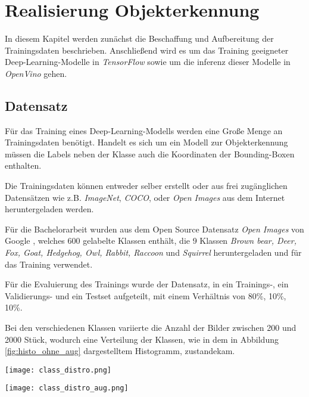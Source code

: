 \chapter{Realisierung Objekterkennung}\label{kap:object_det}

In diesem Kapitel werden zunächst die Beschaffung und Aufbereitung 
der Trainingsdaten beschrieben. Anschließend wird es um das 
Training geeigneter Deep-Learning-Modelle in \textit{TensorFlow}
 sowie um die \Gls{inferenz} dieser Modelle in \textit{OpenVino} gehen.

\section{Datensatz}\label{sec:dataset}

Für das Training eines Deep-Learning-Modells werden 
eine Große Menge an Trainingsdaten benötigt.
Handelt es sich um ein Modell zur Objekterkennung
müssen die Labels neben der Klasse auch die Koordinaten 
der Bounding-Boxen enthalten.

Die Trainingsdaten können entweder selber erstellt oder 
aus frei zugänglichen Datensätzen wie z.B. \textit{ImageNet}, 
\textit{COCO}, oder \textit{Open Images}
aus dem Internet heruntergeladen werden.

Für die Bachelorarbeit wurden aus dem Open Source Datensatz
\textit{Open Images} von Google
\cite{kuznetsovaOpenImagesDataset2018}, 
welches 600 gelabelte Klassen enthält, 
die 9 Klassen \textit{Brown bear, Deer, Fox, Goat, 
Hedgehog, Owl, Rabbit, Raccoon} und \textit{Squirrel}
heruntergeladen und für das Training verwendet.

Für die Evaluierung des Trainings wurde der 
Datensatz, in ein
Trainings-, ein Validierungs- und ein 
Testset aufgeteilt, mit einem Verhältnis von 80\%, 10\%, 10\%.

Bei den verschiedenen Klassen variierte die Anzahl der 
Bilder zwischen 200 und 
2000 Stück, wodurch eine Verteilung der Klassen, 
wie in dem in Abbildung \ref{fig:histo_ohne_aug} dargestelltem
Histogramm, zustandekam.

\vspace{1cm}
\begin{minipage}{0.5\textwidth}
    \centering
    \texttt{[image: class\_distro.png]}
    \label{fig:histo_ohne_aug}
\end{minipage}
\begin{minipage}{0.5\textwidth}
    \centering
    \texttt{[image: class\_distro\_aug.png]}
    \label{fig:histo_mit_aug}
\end{minipage}
\vspace{1cm}

